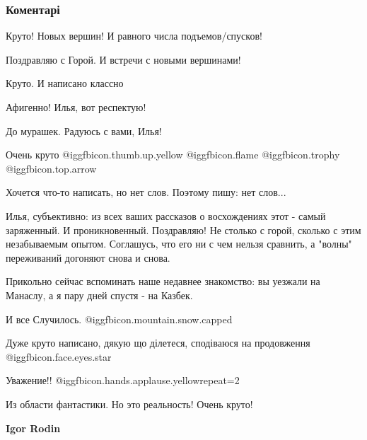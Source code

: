  
 
 
 
 
\subsubsection{Коментарі}

\begin{itemize} %
Круто! Новых вершин! И равного числа подъемов/спусков!

Поздравляю с Горой. И встречи с новыми вершинами!

Круто. И написано классно


Афигенно! Илья, вот респектую!

До мурашек. Радуюсь с вами, Илья!

Очень круто  @igg{fbicon.thumb.up.yellow}   @igg{fbicon.flame}  @igg{fbicon.trophy}  @igg{fbicon.top.arrow} 

Хочется что-то написать, но нет слов. Поэтому пишу: нет слов...


Илья, субъективно: из всех ваших рассказов о восхождениях этот - самый
заряженный. И проникновенный. Поздравляю! Не столько с горой, сколько с этим
незабываемым опытом. Соглашусь, что его ни с чем нельзя сравнить, а "волны"
переживаний догоняют снова и снова.

Прикольно сейчас вспоминать наше недавнее знакомство: вы уезжали на Манаслу, а
я пару дней спустя - на Казбек.

И все Случилось.  @igg{fbicon.mountain.snow.capped} ️

Дуже круто написано, дякую що ділетеся, сподіваюся на продовження @igg{fbicon.face.eyes.star} 

Уважение!!  @igg{fbicon.hands.applause.yellow}{repeat=2} 

Из области фантастики. Но это реальность! Очень круто!

\textbf{Igor Rodin}


\end{itemize}
